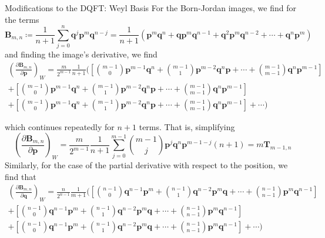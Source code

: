 \documentclass[aspectratio=169]{beamer}
\begin{document}
\begin{frame}[allowframebreaks]{Modifications to the DQFT: Weyl Basis}
		For the Born-Jordan images, we find for the terms
		\begin{equation}
			\textbf{B}_{m,n}\coloneqq\frac{1}{n+1}\sum_{j=0}^n\textbf{q}^j\textbf{p}^m\textbf{q}^{n-j}=\frac{1}{n+1}\left(\textbf{p}^m\textbf{q}^n+\textbf{q}\textbf{p}^m\textbf{q}^{n-1}+\textbf{q}^2\textbf{p}^m\textbf{q}^{n-2}+\cdots+\textbf{q}^n\textbf{p}^m\right)
		\end{equation}
		and finding the image's derivative, we find
		\begin{multline}
			\left( \frac{\partial\textbf{B}_{m,n}}{\partial\textbf{p}}\right)_W=\frac{m}{2^{m-1}}\frac{1}{n+1}\biggl(\left[\binom{m-1}{0}\textbf{p}^{m-1}\textbf{q}^n+\binom{m-1}{1}\textbf{p}^{m-2}\textbf{q}^n\textbf{p}+\cdots+\binom{m-1}{m-1}\textbf{q}^n\textbf{p}^{m-1}\right]\\+\left[\binom{m-1}{0}\textbf{p}^{m-1}\textbf{q}^n+\binom{m-1}{1}\textbf{p}^{m-2}\textbf{q}^n\textbf{p}+\cdots+\binom{m-1}{m-1}\textbf{q}^n\textbf{p}^{m-1}\right]\\+\left[\binom{m-1}{0}\textbf{p}^{m-1}\textbf{q}^n+\binom{m-1}{1}\textbf{p}^{m-2}\textbf{q}^n\textbf{p}+\cdots+\binom{m-1}{m-1}\textbf{q}^n\textbf{p}^{m-1}\right]+\cdots\biggr)
		\end{multline}
		
		\framebreak
		which continues repeatedly for $n+1$ terms. That is, simplifying
		\begin{equation}
			\left( \frac{\partial\textbf{B}_{m,n}}{\partial\textbf{p}}\right)_W=\frac{m}{2^{m-1}}\frac{1}{n+1}\sum_{j=0}^{m-1}\binom{m-1}{j}\textbf{p}^j\textbf{q}^n\textbf{p}^{m-1-j}(n+1)=m\textbf{T}_{m-1,n}
		\end{equation}
		Similarly, for the case of the partial derivative with respect to the position, we find that
		\begin{multline}
			\left( \frac{\partial\textbf{B}_{m,n}}{\partial\textbf{q}}\right)_W=\frac{n}{2^{n-1}}\frac{1}{m+1}\biggl(\left[\binom{n-1}{0}\textbf{q}^{n-1}\textbf{p}^m+\binom{n-1}{1}\textbf{q}^{n-2}\textbf{p}^m\textbf{q}+\cdots+\binom{n-1}{n-1}\textbf{p}^m\textbf{q}^{n-1}\right]\\+\left[\binom{n-1}{0}\textbf{q}^{n-1}\textbf{p}^m+\binom{n-1}{1}\textbf{q}^{n-2}\textbf{p}^m\textbf{q}+\cdots+\binom{n-1}{n-1}\textbf{p}^m\textbf{q}^{n-1}\right]\\+\left[\binom{n-1}{0}\textbf{q}^{n-1}\textbf{p}^m+\binom{n-1}{1}\textbf{q}^{n-2}\textbf{p}^m\textbf{q}+\cdots+\binom{n-1}{n-1}\textbf{p}^m\textbf{q}^{n-1}\right]+\cdots\biggr)
		\end{multline}
		

\end{frame}
\end{document}
